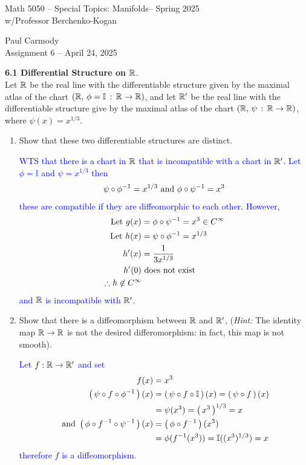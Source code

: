 \documentclass[10pt,a4paper]{report}
\newcommand{\CLASSNAME}{Math 5050 -- Special Topics: Manifolds}
\newcommand{\STUDENTNAME}{Paul Carmody}
\newcommand{\ASSIGNMENT}{Assignment 6 }
\newcommand{\DUEDATE}{April 24, 2025}
\newcommand{\SEMESTER}{Spring 2025}
\newcommand{\BLUE}[1]{\textcolor{blue}{#1}}
\begin{document}
\begin{center}
	\Large{\CLASSNAME -- \SEMESTER} \\
	\large{ w/Professor Berchenko-Kogan}
\end{center}
\begin{center}
	\STUDENTNAME \\
	\ASSIGNMENT -- \DUEDATE\\
\end{center} 

\textbf{6.1 Differential Structure on $\mathbb{R}$}.\\

Let $\mathbb{R}$ be the real line with the differentiable structure given by the maximal atlas of the chart $(\mathbb{R},\, \phi = \mathbb{I}\,:\, \mathbb{R} \to \mathbb{R})$, and let $\mathbb{R}'$ be the real line with the differentiable structure give by the maximal atlas of the chart $(\mathbb{R},\, \psi \,:\, \mathbb{R} \to \mathbb{R})$, where $\psi(x) = x^{1/3}$.
\begin{enumerate}
	\item Show that these two differentiable structures are distinct.
	
	\BLUE{WTS that there is a chart in $\mathbb{R}$ that is incompatible with a chart in $\mathbb{R}'$.  Let $\phi = \mathbb{I}$ and $\psi = x^{1/3}$ then
	\begin{align*}
		\psi \circ \phi^{-1} = x^{1/3}\text{ and } \phi \circ \psi^{-1} = x^3
	\end{align*}these are compatible if they are diffeomorphic to each other.  However, 
	\begin{align*}
		\text{Let } g(x) &= \phi \circ \psi^{-1} = x^3 \in C^\infty \\
		\text{Let } h(x) &= \psi \circ \phi^{-1} = x^{1/3} \\
		h'(x) &= \frac{1}{3x^{1/3}} \\
		h'(0) &\text{ does not exist} \\
		\therefore h \not \in C^\infty
	\end{align*}and $\mathbb{R}$ is incompatible with $\mathbb{R}'$.
	}
	
	\item Show that there is a diffeomorphism between $\mathbb{R}$ and $\mathbb{R}'$, (\textit{Hint:} The identity map $\mathbb{R} \to \mathbb{R}$ is not the desired differomorphism: in fact, this map is not smooth).
	
	\BLUE{Let $f: \mathbb{R} \to \mathbb{R}'$ and set
	\begin{align*}
		f(x) &= x^3 \\
		\left (\, \psi \circ f \circ \phi^{-1} \,\right )(x) &= \left (\, \psi \circ f \circ \mathbb{I} \,\right )(x) = \left (\, \psi \circ f \,\right )(x) \\
		&= \psi(x^3) = \left (\, x^3 \,\right )^{1/3} = x \\
		\text{ and } \left (\, \phi \circ f^{-1} \circ \psi^{-1} \,\right )(x) &= \left (\, \phi \circ f^{-1} \,\right )(x^3) \\
		&= \phi (f^{-1}(x^3)) =  \mathbb{I}((x^3)^{1/3}) = x
	\end{align*}therefore $f$ is a diffeomorphism.
	}
\end{enumerate}
\end{document}

